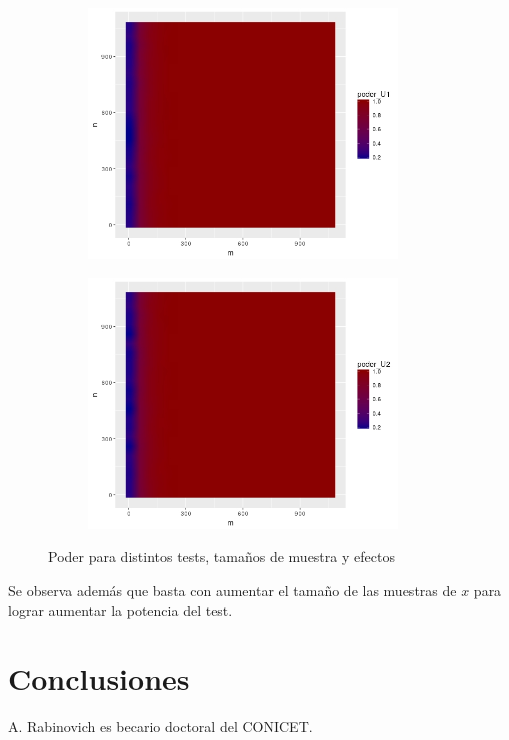 \documentclass[%
 reprint,
 amsmath,amssymb,
 aps,
spanish]{revtex4-1}
\begin{document}
\begin{figure}[t]
\begin{subfigure}[t]{0.45\textwidth}
      \includegraphics[width=0.9\textwidth]{imagenes/poder_U1_02}
    \end{subfigure}
    \begin{subfigure}[t]{0.45\textwidth}
      \centering
      \includegraphics[width=0.9\textwidth]{imagenes/poder_U2_02}
    \end{subfigure} 
    \label{fig:pvalue}
    \caption{Poder para distintos tests, tamaños de muestra y efectos}
\end{figure}

Se observa además que basta con aumentar el tamaño de las muestras de $x$ para lograr aumentar la potencia del test.

\section{Conclusiones}


\begin{acknowledgments}
A. Rabinovich es becario doctoral del CONICET. 
\end{acknowledgments}

\appendix
\end{document}
